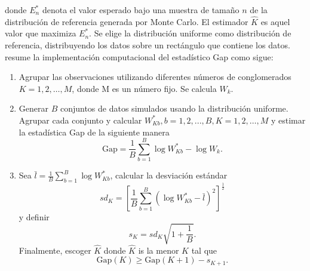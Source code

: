 donde $E^\ast_{n}$ denota el valor esperado bajo una muestra de tamaño $n$ de la distribución de referencia generada por Monte Carlo. El estimador $\hat{K}$  es aquel valor que maximiza $E^\ast_{n}$.  Se elige la distribución uniforme como distribución de referencia, distribuyendo los datos sobre un rectángulo que contiene los datos. \cite{tibshirani01} resume la implementación computacional del estadístico Gap como sigue:
\begin{enumerate}
\item Agrupar las observaciones  utilizando diferentes números de conglomerados $K=1,2,\dots,M$, donde M es un número fijo. Se calcula $W_{k}$.

\item Generar $B$ conjuntos de datos simulados usando la distribución uniforme. Agrupar cada conjunto y calcular $W^{\ast}_{Kb},  b=1,2,...,B,  K=1,2,\dots,M$ y estimar la estadística Gap de la siguiente manera 
\begin{equation}
\mbox{Gap}=\dfrac{1}{B}\sum_{b=1}^B \log{W^{\ast}_{Kb}}-\log{W_{k}}.
\end{equation}

\item Sea $\bar{l}=\frac{1}{B} \sum_{b=1}^B \log{W^{\ast}_{Kb}}$, calcular la desviación estándar 
\begin{equation}
sd_{K}= \left[ \dfrac{1}{B}\sum_{b=1}^B \left(\log{W^{\ast}_{Kb}}-\bar{l}\right)^2 \right] ^{\frac{1}{2}}
\end{equation}
y definir 
\begin{equation}
s_{K}=sd_{K}\sqrt{1+\frac{1}{B}}.
\end{equation}
Finalmente, escoger $\hat{K}$ donde $\hat{K}$ is la menor $K$ tal que
\begin{equation}\label{tibshiranicriteria}
\mbox{Gap}(K) \geq \mbox{Gap}(K+1)-s_{K+1}.
\end{equation}
\end{enumerate}



